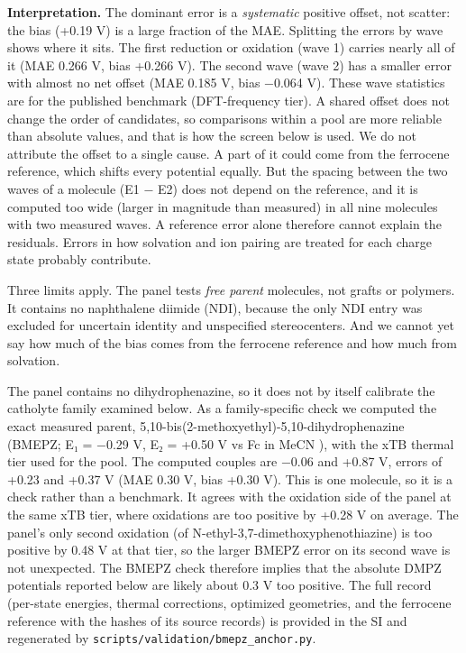 \documentclass[journal=jcisd8,manuscript=article]{achemso}
\begin{document}
\textbf{Interpretation.} The dominant error is a \emph{systematic} positive offset, not scatter: the bias (+0.19 V) is a large fraction of the MAE. Splitting the errors by wave shows where it sits. The first reduction or oxidation (wave 1) carries nearly all of it (MAE 0.266 V, bias +0.266 V). The second wave (wave 2) has a smaller error with almost no net offset (MAE 0.185 V, bias −0.064 V). These wave statistics are for the published benchmark (DFT-frequency tier). A shared offset does not change the order of candidates, so comparisons within a pool are more reliable than absolute values, and that is how the screen below is used. We do not attribute the offset to a single cause. A part of it could come from the ferrocene reference, which shifts every potential equally. But the spacing between the two waves of a molecule (E1 − E2) does not depend on the reference, and it is computed too wide (larger in magnitude than measured) in all nine molecules with two measured waves. A reference error alone therefore cannot explain the residuals. Errors in how solvation and ion pairing are treated for each charge state probably contribute.

Three limits apply. The panel tests \emph{free parent} molecules, not grafts or polymers. It contains no naphthalene diimide (NDI), because the only NDI entry was excluded for uncertain identity and unspecified stereocenters. And we cannot yet say how much of the bias comes from the ferrocene reference and how much from solvation.

The panel contains no dihydrophenazine, so it does not by itself calibrate the catholyte family examined below. As a family-specific check we computed the exact measured parent, 5,10-bis(2-methoxyethyl)-5,10-dihydrophenazine (BMEPZ; E₁ = −0.29 V, E₂ = +0.50 V vs Fc in MeCN \cite{kwon2019}), with the xTB thermal tier used for the pool. The computed couples are −0.06 and +0.87 V, errors of +0.23 and +0.37 V (MAE 0.30 V, bias +0.30 V). This is one molecule, so it is a check rather than a benchmark. It agrees with the oxidation side of the panel at the same xTB tier, where oxidations are too positive by +0.28 V on average. The panel's only second oxidation (of N-ethyl-3,7-dimethoxyphenothiazine) is too positive by 0.48 V at that tier, so the larger BMEPZ error on its second wave is not unexpected. The BMEPZ check therefore implies that the absolute DMPZ potentials reported below are likely about 0.3 V too positive. The full record (per-state energies, thermal corrections, optimized geometries, and the ferrocene reference with the hashes of its source records) is provided in the SI and regenerated by \texttt{scripts/validation/bmepz\_anchor.py}.
\end{document}
